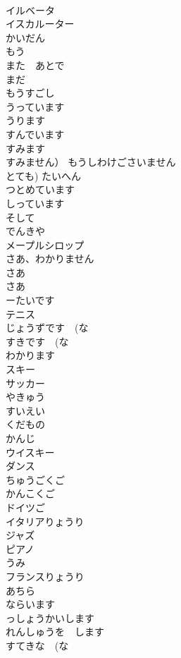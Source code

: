 \documentclass[8pt]{extreport}
\begin{document}
\begin{CJK}{UTF8}{min}
\\	イルベータ		
\\	イスカルーター		
\\	かいだん		
\\	もう	
\\	また　あとで		
\\	まだ		
\\	もうすごし		
\\	うっています		
\\	うります		
\\	すんでいます		
\\	すみます		
\\	すみません）	もうしわけごさいません		
\\	とても)	たいへん		
\\	つとめています		
\\	しっています		
\\	そして		
\\	でんきや		
\\	メープルシロップ		
\\	さあ、わかりません　
\\	さあ 
\\	さあ		
\\	ーたいです		
\\	テニス		
\\	じょうずです　(な 
\\	すきです　(な 
\\	わかります		
\\	スキー		
\\	サッカー		
\\	やきゅう		
\\	すいえい		
\\	くだもの		
\\	かんじ		
\\	ウイスキー		
\\	ダンス		
\\	ちゅうごくご		
\\	かんこくご		
\\	ドイツご		
\\	イタリアりょうり		
\\	ジャズ		
\\	ピアノ		
\\	うみ		
\\	フランスりょうり		
\\	あちら		
\\	ならいます		
\\	っしょうかいします		
\\	れんしゅうを　します		
\\	すてきな　(な 

\end{CJK}
\end{document}

